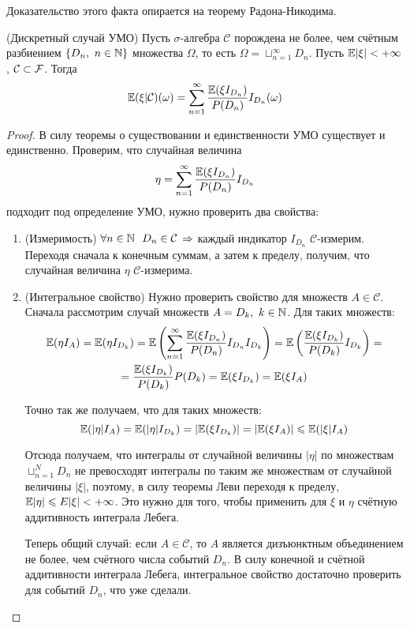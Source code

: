 \begin{note}
    Доказательство этого факта опирается на теорему Радона-Никодима.
\end{note}

\begin{lemma} (Дискретный случай УМО)
    Пусть $\sigma$-алгебра $\mathcal{C}$ порождена не более, чем счётным разбиением $\{D_n,\ n \in \mathbb{N}\}$ множества $\Omega$, то есть $\Omega = \sqcup_{n=1}^{\infty} D_n$. Пусть $\mathbb{E}|\xi| < +\infty$, $\mathcal{C} \subset \mathcal{F}$. Тогда
    \[
        \mathbb{E}(\xi | \mathcal{C})(\omega) = \sum_{n=1}^{\infty} \frac{\mathbb{E}(\xi I_{D_n})}{P(D_n)} I_{D_n}(\omega)
    \]
\end{lemma}

\begin{proof}
    В силу теоремы о существовании и единственности УМО существует и единственно. Проверим, что случайная величина
    \[
        \eta = \sum_{n=1}^{\infty} \frac{\mathbb{E}(\xi I_{D_n})}{P(D_n)} I_{D_n}
    \]
    подходит под определение УМО, нужно проверить два свойства:
    \begin{enumerate}
        \item (Измеримость) $\forall n \in \mathbb{N} \ \ D_n \in \mathcal{C}$ $\Rightarrow$ каждый индикатор $I_{D_n}$ $\mathcal{C}$-измерим. Переходя сначала к конечным суммам, а затем к пределу, получим, что случайная величина $\eta$ $\mathcal{C}$-измерима.

        \item (Интегральное свойство) Нужно проверить свойство для множеств $A \in \mathcal{C}$. Сначала рассмотрим случай множеств $A = D_k,\ k \in \N$. Для таких множеств:
        \begin{multline*}
            \mathbb{E}(\eta I_A) = \mathbb{E}(\eta I_{D_k}) = \mathbb{E} \left( \sum_{n=1}^{\infty} \frac{\mathbb{E}(\xi I_{D_n})}{P(D_n)} I_{D_n} I_{D_k} \right) = \mathbb{E} \left(\frac{\mathbb{E}(\xi I_{D_k})}{P(D_k)} I_{D_k} \right) =
            \\
            = \frac{\mathbb{E}(\xi I_{D_k})}{P(D_k)} P(D_k) = \mathbb{E}(\xi I_{D_k}) = \mathbb{E}(\xi I_A)
        \end{multline*}

        Точно так же получаем, что для таких множеств:
        \[
            \mathbb{E}(|\eta| I_A) = \mathbb{E}(|\eta| I_{D_k}) = |\mathbb{E}(\xi I_{D_k})| = |\mathbb{E}(\xi I_A)| \leqslant \mathbb{E}(|\xi| I_A)
        \]
        
        Отсюда получаем, что интегралы от случайной величины $|\eta|$ по множествам $\sqcup_{n=1}^{N} D_n$ не превосходят интегралы по таким же множествам от случайной величины $|\xi|$, поэтому, в силу теоремы Леви переходя к пределу, $\mathbb{E}|\eta| \leqslant E|\xi| < +\infty$. Это нужно для того, чтобы применить для $\xi$ и $\eta$ счётную аддитивность интеграла Лебега.

        Теперь общий случай: если $A \in \mathcal{C}$, то $A$ является дизъюнктным объединением не более, чем счётного числа событий $D_n$. В силу конечной и счётной аддитивности интеграла Лебега, интегральное свойство достаточно проверить для событий $D_n$, что уже сделали.
    \end{enumerate}
\end{proof}

